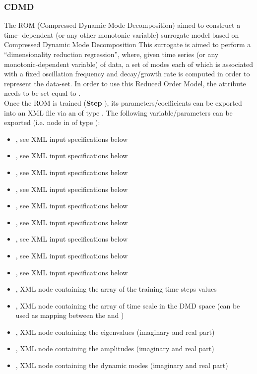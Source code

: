 \subsubsection{CDMD}
  The  ROM (Compressed Dynamic Mode Decomposition) aimed to construct a time-
  dependent (or any other monotonic     variable) surrogate model based on Compressed Dynamic Mode
  Decomposition     This surrogate is aimed to perform a ``dimensionality reduction regression'',
  where, given time     series (or any monotonic-dependent variable) of data, a set of modes each of
  which is associated     with a fixed oscillation frequency and decay/growth rate is computed
  in order to represent the data-set.     In order to use this Reduced Order Model, the
   attribute      needs to be set equal to .     \\
  Once the ROM  is trained (\textbf{Step} ), its parameters/coefficients can be
  exported into an XML file     via an  of type . The following
  variable/parameters  can be exported (i.e.  node     in  of type
  ):     \begin{itemize}       \item {}, see XML input
  specifications below       \item {}, see XML input specifications below
  \item {}, see XML input specifications below       \item {},
  see XML input specifications below       \item {}, see XML input
  specifications below       \item {}, see XML input specifications below
  \item {}, see XML input specifications below       \item
  , see XML input specifications below       \item
  , see XML input specifications below       \item {}, XML node
  containing the array of the training time steps values       \item {}, XML
  node containing the array of time scale in the DMD space (can be used as mapping       between the
   and )       \item {}, XML node containing
  the eigenvalues (imaginary and real part)       \item {}, XML node containing
  the amplitudes (imaginary and real part)       \item {}, XML node containing the
  dynamic modes (imaginary and real part)     \end{itemize}

